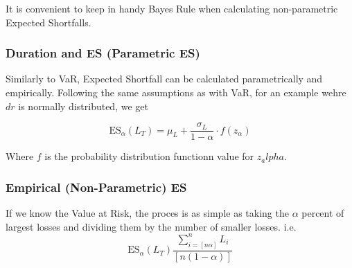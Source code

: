 \documentclass[10pt,letterpaper]{article}
\begin{document}
It is convenient to keep in handy Bayes Rule when calculating non-parametric Expected Shortfalls.

\subsubsection{Duration and ES (Parametric ES)}

Similarly to VaR, Expected Shortfall can be calculated parametrically and empirically. Following the same assumptions as with VaR, for an example wehre $dr$ is normally distributed, we get 

\begin{equation}\label{parametrices}
\mbox{ES}_\alpha(L_T) = \mu_L + \frac{\sigma_L}{1-\alpha} \cdot f(z_\alpha)
\end{equation}

Where $f$ is the probability distribution functionn value for $z_alpha$.

\subsubsection{Empirical (Non-Parametric) ES}
If we know the Value at Risk, the proces is as simple as taking the $\alpha$ percent of largest losses and dividing them by the number of smaller losses. i.e.
\begin{equation}\label{empirices}
\mbox{ES}_\alpha(L_T) \frac{\sum_{i=[n\alpha]}^n L_i}{[n(1-\alpha )]}
\end{equation}
\end{document}

